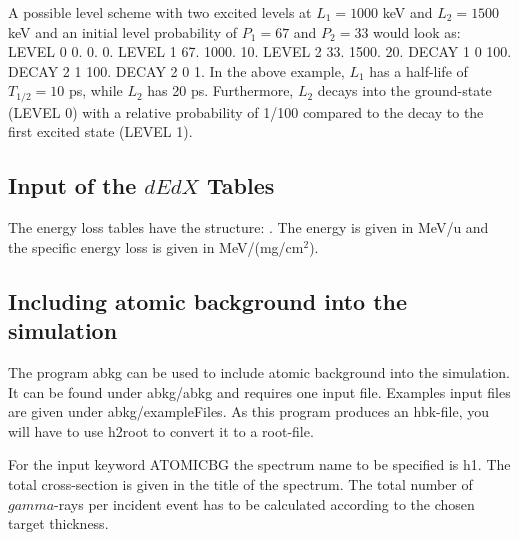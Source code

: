 \documentclass[12pt]{book}
\begin{document}
A possible level scheme with two excited levels at $L_{1}= 1000$ keV and $L_{2}= 1500$ keV and an initial level 
probability of $P_{1}= 67$ and $P_{2}= 33$ would look as:\hfill{}
\linebreak
\linebreak
{\ttfamily
  LEVEL  0  0.  0. 0.\linebreak
  LEVEL  1  67. 1000. 10. \linebreak
  LEVEL  2  33. 1500. 20.\linebreak
  DECAY  1  0 100.\linebreak
  DECAY  2  1 100.\linebreak
  DECAY  2  0   1.\linebreak
}
\linebreak
\linebreak
In the above example, $L_{1}$ has a half-life of $T_{1/2} = 10$ ps, while $L_{2}$ has 20 ps. Furthermore, $L_{2}$
decays into the ground-state (LEVEL 0) with a relative probability of 1/100 compared to the decay to 
the first excited state (LEVEL 1).  

\subsection{Input of the $dEdX$ Tables}

The energy loss tables have the structure: \hfill{} \linebreak
{}. \hfill{} \linebreak \linebreak
The energy is given in 
MeV/u and the specific energy loss is given in MeV/(mg/cm$^2$).   


\subsection{Including atomic background into the simulation}
\label{sec:abkg}

The program abkg can be used to include atomic background into the simulation.
It can be found under abkg/abkg and requires one input file. Examples input files
are given under abkg/exampleFiles.
As this program produces an hbk-file, you will have to use h2root to convert it to
a root-file. 

For the input keyword ATOMICBG the spectrum name to be specified is h1. The total 
cross-section is given in the title of the spectrum. The total number of $gamma$-rays
per incident event has to be calculated according to the chosen target thickness.
\end{document}
